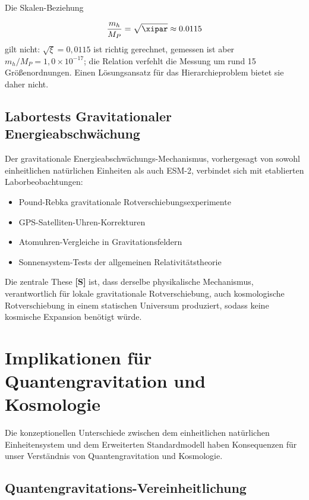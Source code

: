 	Die Skalen-Beziehung
	
	\begin{equation}
		\frac{m_h}{M_P} = \sqrt{\xipar} \approx 0.0115
	\end{equation}
	gilt nicht: $\sqrt{\xi} = 0{,}0115$ ist richtig gerechnet, gemessen ist aber $m_h/M_P = 1{,}0\times10^{-17}$; die Relation verfehlt die Messung um rund 15 Größenordnungen. Einen Lösungsansatz für das Hierarchieproblem bietet sie daher nicht.

	\subsection{Labortests Gravitationaler Energieabschwächung}
	\label{subsec:laboratory_tests}
	
	Der gravitationale Energieabschwächungs-Mechanismus, vorhergesagt von sowohl einheitlichen natürlichen Einheiten als auch ESM-2, verbindet sich mit etablierten Laborbeobachtungen:
	
	\begin{itemize}
		\item Pound-Rebka gravitationale Rotverschiebungsexperimente
		\item GPS-Satelliten-Uhren-Korrekturen
		\item Atomuhren-Vergleiche in Gravitationsfeldern
		\item Sonnensystem-Tests der allgemeinen Relativitätstheorie
	\end{itemize}
	
	Die zentrale These \textbf{[S]} ist, dass derselbe physikalische Mechanismus, verantwortlich für lokale gravitationale Rotverschiebung, auch kosmologische Rotverschiebung in einem statischen Universum produziert, sodass keine kosmische Expansion benötigt würde.
	
	\section{Implikationen für Quantengravitation und Kosmologie}
	\label{sec:implications}
	
	Die konzeptionellen Unterschiede zwischen dem einheitlichen natürlichen Einheitensystem und dem Erweiterten Standardmodell haben Konsequenzen für unser Verständnis von Quantengravitation und Kosmologie.
	
	\subsection{Quantengravitations-Vereinheitlichung}
	\label{subsec:quantum_gravity_unification}
	
